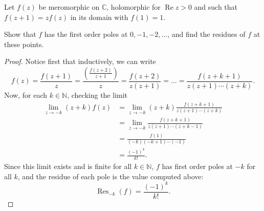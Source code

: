 \documentclass{article}
\newenvironment{problem}[2][Problem]{\begin{trivlist}
\item[\hskip \labelsep {\bfseries #1}\hskip \labelsep {\bfseries #2.}]}{\end{trivlist}}
\begin{document}
\pagebreak

\begin{problem}{4}
  Let $f(z)$ be meromorphic on $\mathbb C$, holomorphic for
  $\operatorname{Re} z > 0$ and such that $f(z + 1) = zf(z)$ in its domain with
  $f(1) = 1$.

  Show that $f$ has the first order poles at $0, -1, -2, \hdots$, and find the
  residues of $f$ at these points.
\end{problem}

\begin{proof}
  Notice first that inductively, we can write \[
    f(z)
    = \frac{f(z + 1)}{z}
    = \frac{\left(\frac{f(z + 2)}{z + 1}\right)}{z}
    = \frac{f(z + 2)}{z(z+1)}
    = \hdots
    = \frac{f(z + k + 1)}{z(z + 1)\cdots(z+k)}.
  \]
  Now, for each $k \in \mathbb N$, checking the limit \begin{align*}
    \lim_{z \rightarrow -k} (z + k)f(z)
    &= \lim_{z \rightarrow -k} (z + k)\frac{f(z + k + 1)}{z(z + 1)\cdots(z+k)} \\
    &= \lim_{z \rightarrow -k} \frac{f(z + k + 1)}{z(z + 1)\cdots(z+k-1)} \\
    &= \frac{f(1)}{(-k)(-k + 1)\cdots(-1)} \\
    &= \frac{(-1)^k}{k!}.
  \end{align*}
  Since this limit exists and is finite for all $k \in \mathbb N$, $f$ has first
  order poles at $-k$ for all $k$, and the residue of each pole is the value
  computed above: \[
    \operatorname{Res}_{-k}(f) = \frac{(-1)^k}{k!}.
  \]
\end{proof}
\end{document}
